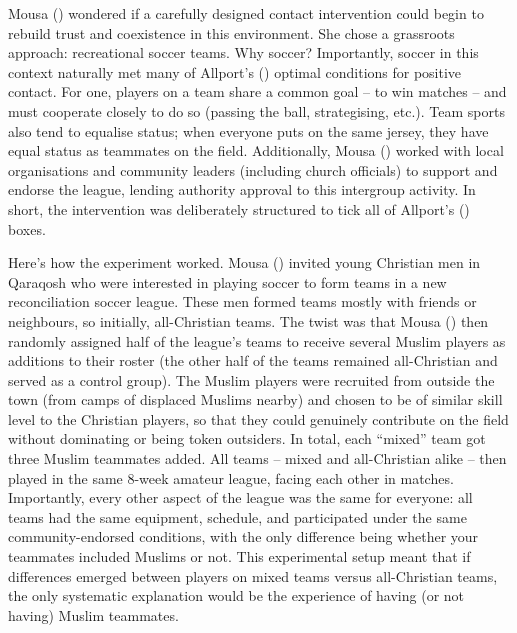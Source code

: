 \documentclass[
  letterpaper,
]{book}
\begin{document}
Mousa () wondered if a carefully
designed contact intervention could begin to rebuild trust and
coexistence in this environment. She chose a grassroots approach:
recreational soccer teams. Why soccer? Importantly, soccer in this
context naturally met many of Allport's
() optimal conditions for positive
contact. For one, players on a team share a common goal -- to win
matches -- and must cooperate closely to do so (passing the ball,
strategising, etc.). Team sports also tend to equalise status; when
everyone puts on the same jersey, they have equal status as teammates on
the field. Additionally, Mousa
() worked with local
organisations and community leaders (including church officials) to
support and endorse the league, lending authority approval to this
intergroup activity. In short, the intervention was deliberately
structured to tick all of Allport's ()
boxes.

Here's how the experiment worked. Mousa
() invited young Christian men
in Qaraqosh who were interested in playing soccer to form teams in a new
reconciliation soccer league. These men formed teams mostly with friends
or neighbours, so initially, all-Christian teams. The twist was that
Mousa () then randomly assigned
half of the league's teams to receive several Muslim players as
additions to their roster (the other half of the teams remained
all-Christian and served as a control group). The Muslim players were
recruited from outside the town (from camps of displaced Muslims nearby)
and chosen to be of similar skill level to the Christian players, so
that they could genuinely contribute on the field without dominating or
being token outsiders. In total, each ``mixed'' team got three Muslim
teammates added. All teams -- mixed and all-Christian alike -- then
played in the same 8-week amateur league, facing each other in matches.
Importantly, every other aspect of the league was the same for everyone:
all teams had the same equipment, schedule, and participated under the
same community-endorsed conditions, with the only difference being
whether your teammates included Muslims or not. This experimental setup
meant that if differences emerged between players on mixed teams versus
all-Christian teams, the only systematic explanation would be the
experience of having (or not having) Muslim teammates.
\end{document}
